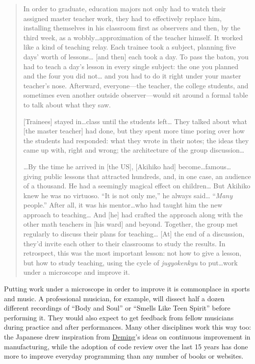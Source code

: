 \begin{quote}

  In order to graduate, education majors not only had to watch their
  assigned master teacher work, they had to effectively replace him,
  installing themselves in his classroom first as observers and then,
  by the third week, as a wobbly{\ldots}approximation of the teacher
  himself.  It worked like a kind of teaching relay. Each trainee took
  a subject, planning five days' worth of lessons{\ldots} {[}and
  then{]} each took a day. To pass the baton, you had to teach a day's
  lesson in every single subject: the one you planned and the four you
  did not{\ldots} and you had to do it right under your master
  teacher's nose. Afterward, everyone---the teacher, the college
  students, and sometimes even another outside observer---would sit
  around a formal table to talk about what they saw.

  {[}Trainees{]} stayed in{\ldots}class until the students
  left{\ldots} They talked about what {[}the master teacher{]} had
  done, but they spent more time poring over how the students had
  responded: what they wrote in their notes; the ideas they came up
  with, right and wrong; the architecture of the group
  discussion{\ldots}

  {\ldots}By the time he arrived in {[}the US{]}, {[}Akihiko had{]}
  become{\ldots}famous{\ldots} giving public lessons that attracted
  hundreds, and, in one case, an audience of a thousand. He had a
  seemingly magical effect on children{\ldots} But Akihiko knew he was
  no virtuoso. ``It is not only me,'' he always said{\ldots}
  ``\emph{Many} people.'' After all, it was his mentor{\ldots}who had
  taught him the new approach to teaching{\ldots} And {[}he{]} had
  crafted the approach along with the other math teachers in {[}his
  ward{]} and beyond. Together, the group met regularly to discuss
  their plans for teaching{\ldots} {[}At{]} the end of a discussion,
  they'd invite each other to their classrooms to study the
  results. In retrospect, this was the most important lesson: not how
  to give a lesson, but how to study teaching, using the cycle
  of \emph{jugyokenkyu} to put{\ldots}work under a microscope and
  improve it.

\end{quote}

Putting work under a microscope in order to improve it is commonplace
in sports and music.  A professional musician, for example, will
dissect half a dozen different recordings of ``Body and Soul'' or
``Smells Like Teen Spirit'' before performing it. They would also
expect to get feedback from fellow musicians during practice and after
performances.  Many other disciplines work this way too: the Japanese
drew inspiration from
\href{https://en.wikipedia.org/wiki/W.\_Edwards\_Deming}{Deming}'s
ideas on continuous improvement in manufacturing, while the adoption
of code review over the last 15 years has done more to improve
everyday programming than any number of books or websites.


